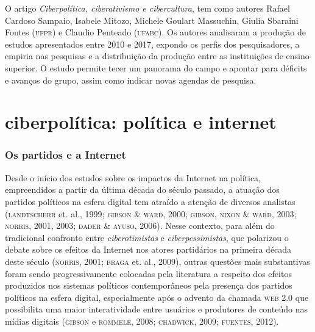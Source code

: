 O artigo \textit{Ciberpolítica, ciberativismo e cibercultura}, tem como
autores Rafael Cardoso Sampaio, Isabele Mitozo, Michele Goulart
Massuchin, Giulia Sbaraini Fontes (\textsc{ufpr}) e Claudio Penteado (\textsc{ufabc}). Os
autores analisaram a produção de estudos apresentados entre 2010 e 2017,
expondo os perfis dos pesquisadores, a empiria nas pesquisas e a distribuição da produção entre as
instituições de ensino superior. O estudo permite tecer um panorama do
campo e apontar para déficits e avanços do grupo, assim como indicar
novas agendas de pesquisa.




\part{ciberpolítica: política e internet}




\begin{flushright}
\end{flushright}

\section{Os partidos e a Internet}

\noindent{}Desde o início dos estudos sobre os impactos da Internet na política,
empreendidos a partir da última década do século passado, a atuação dos
partidos políticos na esfera digital tem atraído a atenção de diversos
analistas (\textsc{landtscherr} et. al., 1999; \textsc{gibson} \& \textsc{ward}, 2000; \textsc{gibson},
\textsc{nixon} \& \textsc{ward}, 2003; \textsc{norris}, 2001, 2003; \textsc{dader} \& \textsc{ayuso}, 2006). Nesse
contexto, para além do tradicional confronto entre \textit{ciberotimistas} e
\textit{ciberpessimistas}, que polarizou o debate sobre os efeitos da
Internet nos atores partidários na primeira década deste século (\textsc{norris},
2001; \textsc{braga} et. al., 2009), outras questões mais substantivas foram
sendo progressivamente colocadas pela literatura a respeito dos efeitos
produzidos nos sistemas políticos contemporâneos pela presença dos
partidos políticos na esfera digital, especialmente após o advento da
chamada \textsc{web 2.0} que possibilita uma maior interatividade entre
usuários e produtores de conteúdo nas mídias digitais (\textsc{gibson} e \textsc{rommele},
2008; \textsc{chadwick}, 2009; \textsc{fuentes}, 2012).

